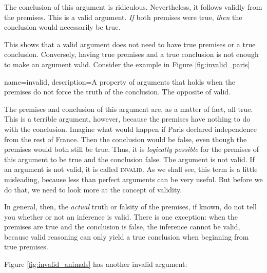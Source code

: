 
The conclusion of this argument is ridiculous. Nevertheless, it follows validly from the premises. This is a valid argument. \emph{If} both premises were true, \emph{then} the conclusion would necessarily be true.

This shows that a valid argument does not need to have true premises or a true conclusion. Conversely, having true premises and a true conclusion is not enough to make an argument valid. Consider the example in Figure \ref{fig:invalid_paris}


\begin{kormanize}
\end{kormanize}


{
name=invalid,
description={A property of arguments that holds when the premises do not force the truth of the conclusion. The opposite of valid.}
}


The premises and conclusion of this argument are, as a matter of fact, all true. This is a terrible argument, however, because the premises have nothing to do with the conclusion. Imagine what would happen if Paris declared independence from the rest of France. Then the conclusion would be false, even though the premises would both still be true. Thus, it is \emph{logically possible} for the premises of this argument to be true and the conclusion false. The argument is not valid.  If an argument is not valid, it is called \textsc{\gls{invalid}}. \label{def:invalid} As we shall see, this term is a little misleading, because less than perfect arguments can be very useful. But before we do that, we need to look more at the concept of validity.

In general, then, the \textit{actual} truth or falsity of the premises, if known, do not tell you whether or not an inference is valid. There is one exception: when the premises are true and the conclusion is false, the inference cannot be valid, because valid reasoning can only yield a true conclusion when beginning from true premises.

Figure \ref{fig:invalid_animals} has another invalid argument:

\begin{kormanize}
\end{kormanize}

